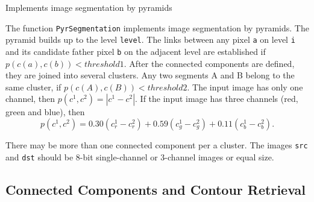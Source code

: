 \label{PyrSegmentation}

Implements image segmentation by pyramids


\begin{description}
\end{description}

The function \texttt{PyrSegmentation} implements image segmentation by pyramids. The pyramid builds up to the level \texttt{level}. The links between any pixel \texttt{a} on level \texttt{i} and its candidate father pixel \texttt{b} on the adjacent level are established if
$p(c(a),c(b))<threshold1$.
After the connected components are defined, they are joined into several clusters.
Any two segments A and B belong to the same cluster, if $p(c(A),c(B))<threshold2$.
The input image has only one channel, then $p(c^1,c^2)=|c^1-c^2|$.
If the input image has three channels (red, green and blue), then
\[
  p(c^1,c^2) = 0.30 (c^1_r - c^2_r) +
               0.59 (c^1_g - c^2_g) +
               0.11 (c^1_b - c^2_b).
\]

There may be more than one connected component per a cluster. The images \texttt{src} and \texttt{dst} should be 8-bit single-channel or 3-channel images or equal size.

\subsection{Connected Components and Contour Retrieval}

\label{CvConnectedComp}

